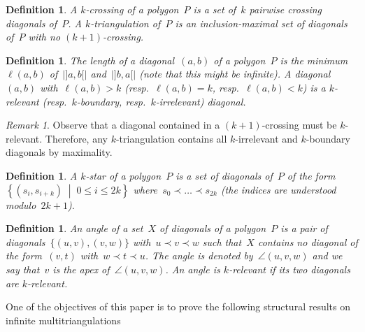 \documentclass{amsart}
\newtheorem{definition}[theorem]{Definition}
\theoremstyle{remark}
\newtheorem{remark}{Remark}[section]
\newcommand{\darkblue}{\color{darkblue}} %
\newcommand{\defn}[1]{\textsl{\darkblue #1}} %
\newcommand{\set}[2]{\left\{ #1 \;\middle|\; #2 \right\}} %
\newcommand*{\ktg}[0]{$k$-triangulation\xspace}
\newcommand{\cl}{\prec}
\begin{document}
\begin{definition}
A \defn{$k$-crossing} of a polygon~$P$ is a set of~$k$ pairwise crossing diagonals of~$P$.
A \defn{$k$-triangulation} of~$P$ is an inclusion-maximal set of diagonals of~$P$ with no $(k+1)$-crossing.
\end{definition}

\begin{definition}
The \defn{length} of a diagonal~$(a,b)$ of a polygon~$P$ is the minimum~$\ell(a,b)$ of~$|{]a,b[}|$ and~$|{]b,a[}|$ (note that this might be infinite).
A diagonal~$(a,b)$ with~$\ell(a,b) > k$ (resp.~$\ell(a,b) = k$, resp.~$\ell(a,b) < k$) is a \defn{$k$-relevant} (resp.~\defn{$k$-boundary}, resp.~\defn{$k$-irrelevant}) diagonal.
\end{definition}

\begin{remark}
Observe that a diagonal contained in a $(k+1)$-crossing must be $k$-relevant.
Therefore, any \ktg contains all $k$-irrelevant and $k$-boundary diagonals by maximality.
\end{remark}


\begin{definition}
A \defn{$k$-star} of a polygon~$P$ is a set of diagonals of~$P$ of the form~$\set{(s_i, s_{i+k})}{0 \le i \le 2k}$ where~$s_0 \cl \dots \cl s_{2k}$ (the indices are understood modulo~$2k+1$).
\end{definition}

\begin{definition}
An \defn{angle} of a set~$X$ of diagonals of a polygon~$P$ is a pair of diagonals~$\{(u,v), (v,w)\}$ with~$u \cl v \cl w$ such that~$X$ contains no diagonal of the form~$(v,t)$ with~$w \cl t \cl u$. The angle is denoted by~$\angle(u,v,w)$ and we say that~$v$ is the \defn{apex} of~$\angle(u,v,w)$. An angle is \defn{$k$-relevant} if its two diagonals are $k$-relevant. %
\end{definition}

One of the objectives of this paper is to prove the following structural results on infinite multitriangulations
\end{document}
